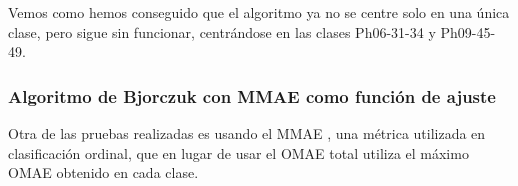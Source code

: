 Vemos como hemos conseguido que el algoritmo ya no se centre solo en una única clase, pero sigue sin funcionar, centrándose en las clases Ph06-31-34 y Ph09-45-49.

\newpage

\subsubsection{Algoritmo de Bjorczuk con MMAE como función de ajuste}

Otra de las pruebas realizadas es usando el MMAE \cite{funcionesClasificacionOrdinal}, una métrica utilizada en clasificación ordinal, que en lugar de usar el OMAE total utiliza el máximo OMAE obtenido en cada clase.


